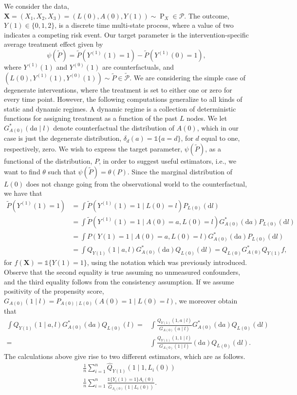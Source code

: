 \documentclass{article}
\newcommand{\A}[1]{A(#1)}
\renewcommand{\L}[1]{L(#1)}
\newcommand{\Y}[1]{Y(#1)}
\newcommand{\Ystar}[2]{Y^{(#1)}(#2)}
\newcommand{\Asubs}[2]{A_{#1}(#2)}
\newcommand{\Lsubs}[2]{L_{#1}(#2)}
\newcommand{\Ysubs}[2]{Y_{#1}(#2)}
\newcommand{\distx}{\ensuremath{\P_{X}}}
\renewcommand{\P}{\ensuremath{\operatorname{P}}}
\renewcommand{\d}{\ensuremath{\mathrm{d}}}
\begin{document}
We consider the data, $\textbf{X}=(X_1,X_2,X_3)=(\L{0},\A{0},\Y{1})\sim \distx\in\mathcal{P}$. 
The outcome, $Y(1)\in\{0,1,2\}$, is a discrete
time multi-state process, where a value of two indicates a competing
risk event.
Our target parameter is the intervention-specific average
treatment effect given by
$$\psi(\tilde{P})=\tilde{P}(\Ystar{1}{1}=1)-\tilde{P}(\Ystar{1}{0}=1),$$
where $\Ystar{1}{1}$ and $\Ystar{0}{1}$ are counterfactuals, and $(\L{0},\Ystar{1}{1},\Ystar{0}{1})\sim\tilde{P}\in\tilde{\mathcal{P}}$. We are considering the simple case of degenerate interventions, where the treatment is set to either one or zero for every time point. However, the following computations generalize to all kinds of static and \d ynamic regimes. A \d ynamic regime is a collection of deterministic functions for assigning treatment as a function of the past $L$ nodes. We let $G^*_{\A{0}}(\d a\mid l)$ denote counterfactual the distribution of $\A{0}$, which in our case is just the degenerate distribution, $\delta_d(a)=\mathds{1}\{a=d\}$, for $d$ equal to one, respectively, zero. We wish to express the target parameter, $\psi(\tilde{P})$, as a functional of the distribution, $P$, in order to suggest useful estimators, i.e., we want to find $\theta$ such that $\psi(\tilde{P})=\theta(P)$. Since the marginal distribution of $\L{0}$ does not change going from the observational world to the counterfactual, we have that
\begin{align*}
    \tilde{P}(\Ystar{1}{1}=1)&=\int\tilde{P}(\Ystar{1}{1}=1\mid \L{0}=l)P_{\L{0}}(\d l)\\
    &=\int\tilde{P}(\Ystar{1}{1}=1\mid \A{0}=a,\L{0}=l)G^*_{\A{0}}(\d a)P_{\L{0}}(\d l)\\
    &=\int P(\Y{1}=1\mid \A{0}=a,\L{0}=l)G^*_{\A{0}}(\d a)P_{\L{0}}(\d l)\\
    &=\int Q_{\Y{1}}(1\mid a,l)G^*_{\A{0}}(\d a)Q_{\L{0}}(\d l)=Q_{\L{0}}G^*_{\A{0}}Q_{\Y{1}}f,
\end{align*}
for $f(\textbf{X})=\mathds{1}\{\Y{1}=1\}$, using the notation which was previously introduced. Observe that the second equality is true assuming no unmeasured confounders, and the third equality follows from the consistency assumption. If we assume positivity of the propensity score, $G_{\A{0}}(1\mid l)=P_{\A{0}\mid \L{0}}(\A{0}=1\mid \L{0}=l)$, we moreover obtain that
\begin{align*}
    \int Q_{\Y{1}}(1\mid a,l)G^*_{\A{0}}(\d a)Q_{\L{0}}(l)=&\int\frac{Q_{\Y{1}}(1,a\mid l)}{G_{\A{0}}(a\mid l)}G^*_{\A{0}}(\d a)Q_{\L{0}}(\d l)\\
    =&\int\frac{Q_{\Y{1}}(1,1\mid l)}{G_{\A{0}}(1\mid l)}(\d a)Q_{\L{0}}(\d l).
\end{align*}
The calculations above give rise to two different estimators, which are as follows.
\begin{align*}
    &\frac{1}{n}\sum_{i=1}^n\hat{Q}_{\Y{1}}(1\mid 1,\Lsubs{i}{0})\tag{G-formula}\\
    &\frac{1}{n}\sum_{i=1}^n\frac{\mathds{1}\{\Ysubs{i}{1}=1\}\Asubs{i}{0}}{\hat{G}_{\Asubs{i}{0}}(1\mid \Lsubs{i}{0})}.\tag{IPTW}
\end{align*}
\end{document}
